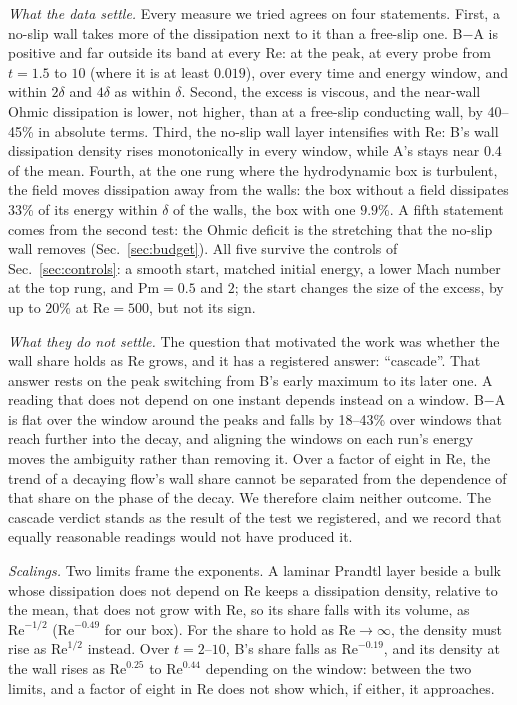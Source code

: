 \documentclass[aip,pop,reprint,amsmath,amssymb,superscriptaddress,floatfix]{revtex4-2}
\newcommand{\Rey}{\mathrm{Re}}
\begin{document}
\emph{What the data settle.} Every measure we tried agrees on four statements. First,
a no-slip wall takes more of the dissipation next to it than a free-slip one. B$-$A is
positive and far outside its band at every $\Rey$: at the peak, at every probe from
$t=1.5$ to $10$ (where it is at least $0.019$), over every time and energy window, and
within $2\delta$ and $4\delta$ as within $\delta$. Second, the excess is viscous,
and the near-wall Ohmic dissipation is lower, not higher, than at a free-slip
conducting wall, by 40--45\% in absolute terms. Third, the no-slip wall layer
intensifies with $\Rey$: B's wall dissipation density rises monotonically in every
window, while A's stays near $0.4$ of the mean. Fourth, at the one rung where the
hydrodynamic box is turbulent, the field moves dissipation away from the walls: the
box without a field dissipates $33$\% of its energy within $\delta$ of the walls, the
box with one $9.9$\%. A fifth statement comes from the second test: the Ohmic deficit
is the stretching that the no-slip wall removes (Sec.~\ref{sec:budget}). All five
survive the controls of Sec.~\ref{sec:controls}: a smooth start, matched initial
energy, a lower Mach number at the top rung, and $\mathrm{Pm}=0.5$ and $2$; the start
changes the size of the excess, by up to $20$\% at $\Rey=500$, but not its sign.

\emph{What they do not settle.} The question that motivated the work was whether the
wall share holds as $\Rey$ grows, and it has a registered answer: ``cascade''. That
answer rests on the peak switching from B's early maximum to its later one. A reading
that does not depend on one instant depends instead on a window. B$-$A is flat over
the window around the peaks and falls by 18--43\% over windows that reach
further into the decay, and aligning the windows on each run's energy moves the
ambiguity rather than removing it. Over a factor of eight in $\Rey$, the trend of a
decaying flow's wall share cannot be separated from the dependence of that share on
the phase of the decay. We therefore claim neither outcome. The cascade verdict stands
as the result of the test we registered, and we record that equally reasonable
readings would not have produced it.

\emph{Scalings.} Two limits frame the exponents. A laminar Prandtl layer beside a bulk
whose dissipation does not depend on $\Rey$ keeps a dissipation density, relative to
the mean, that does not grow with $\Rey$, so its share falls with its volume, as
$\Rey^{-1/2}$ ($\Rey^{-0.49}$ for our box). For the share to hold as $\Rey\to\infty$,
the density must rise as $\Rey^{1/2}$ instead. Over $t=2$--$10$, B's share falls as
$\Rey^{-0.19}$, and its density at the wall rises as $\Rey^{0.25}$ to $\Rey^{0.44}$
depending on the window: between the two limits, and a factor of eight in $\Rey$ does
not show which, if either, it approaches.
\end{document}
